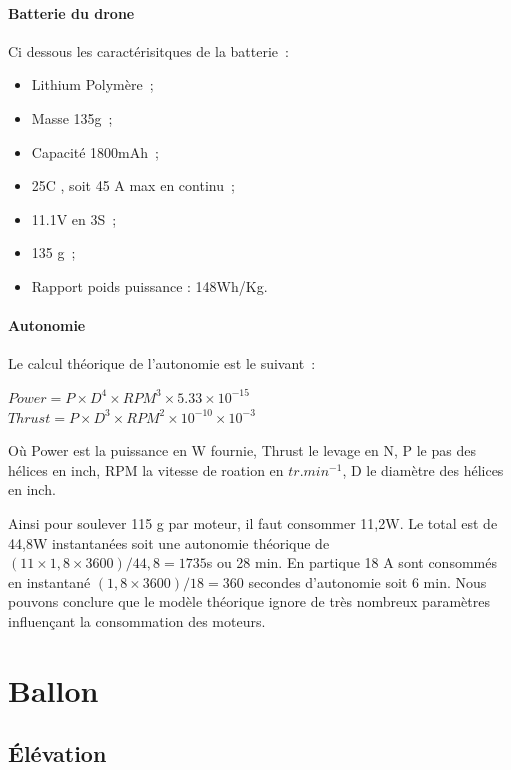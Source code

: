 \documentclass[a4paper,11pt]{article}
\begin{document}
\paragraph{Batterie du drone}

Ci dessous les caractérisitques de la batterie~:
\begin{itemize}
		\item Lithium Polymère~;
		\item Masse 135g~;
		\item Capacité 1800mAh~;
		\item 25C , soit 45 A max en continu~;
		\item 11.1V en 3S~;
		\item 135 g~;
		\item Rapport poids puissance : 148Wh/Kg.
\end{itemize}


\paragraph{Autonomie}

Le calcul théorique de l'autonomie est le suivant~:

\begin{center}
 $Power = P \times D^4 \times RPM^3 \times 5.33 \times 10^{-15}$ \\
 $Thrust = P \times D^3 \times RPM^2 \times 10^{-10} \times 10^{-3}$
\end{center}

Où Power est la puissance en W fournie, Thrust le levage en N, P le pas des hélices en inch, RPM la vitesse de roation en $tr.min^{-1}$, D le diamètre des hélices en inch.

Ainsi pour soulever 115 g par moteur, il faut consommer 11,2W. Le total est de 44,8W instantanées soit une autonomie théorique de $(11 \times 1,8 \times 3600)/44,8 = 1735$s ou 28 min.
En partique 18 A sont consommés en instantané $(1,8 \times 3600)/18 = 360$ secondes d’autonomie soit 6 min. Nous pouvons conclure que le modèle théorique ignore de très nombreux paramètres influençant la consommation des moteurs.

\section{Ballon}

\subsection{Élévation}
\end{document}
